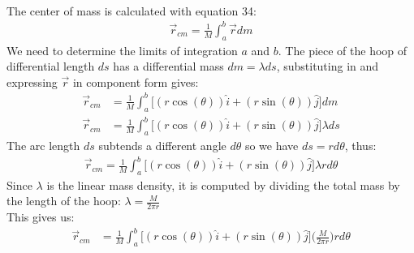 \documentclass[a4paper]{article}
\def\centerarc[#1](#2)(#3:#4:#5){\draw[#1] ($(#2)+({#5*cos(#3)},{#5*sin(#3)})$) arc (#3:#4:#5)}
\begin{document}
\begin{shaded}
\\
    The center of mass is calculated with equation 34:
    \begin{align*}
        \displaystyle \vec{r}_{cm} = \frac{1}{M} \int_{a}^{b}\vec{r}dm 
    \end{align*}
    We need to determine the limits of integration $a$ and $b$. The piece of the hoop of differential length $ds$ has a differential mass $dm = \lambda ds$, substituting in and expressing $\vec{r}$ in component form gives:
    \begin{align*}
        \vec{r}_{cm} &= \frac{1}{M}\int_{a}^{b} \Big[(r\cos(\theta))\hat{i} + (r\sin(\theta))\hat{j}\Big]dm\\
        \vec{r}_{cm} &= \frac{1}{M}\int_{a}^{b} \Big[(r\cos(\theta))\hat{i} + (r\sin(\theta))\hat{j}\Big]\lambda ds
    \end{align*}
    The arc length $ds$ subtends a different angle $d\theta$ so we have $ds = rd\theta$, thus:
    \begin{align*}
        \vec{r}_{cm} = \frac{1}{M}\int_{a}^{b} \Big[(r\cos(\theta))\hat{i} + (r\sin(\theta))\hat{j}\Big]\lambda rd\theta
    \end{align*}
    Since $\lambda$ is the linear mass density, it is computed by dividing the total mass by the length of the hoop: $\displaystyle \lambda = \frac{M}{2\pi r}$\\
    This gives us:
    \begin{align*}
        \vec{r}_{cm} &= \frac{1}{M}\int_{a}^{b} \Big[(r\cos(\theta))\hat{i} + (r\sin(\theta))\hat{j}\Big]\bigg(\frac{M}{2\pi r}\bigg) rd\theta\\

\end{align*}
\end{shaded}
\end{document}
